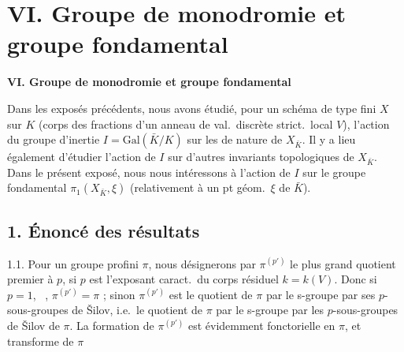\documentclass[11pt,a4paper]{article}
\begin{document}
\section{VI. Groupe de monodromie et groupe fondamental}

\textbf{VI. Groupe de monodromie et groupe fondamental}

 Dans les exposés précédents, nous avons étudié, pour un schéma de type fini $X$ sur $K$ (corps des fractions d'un anneau de val.\ discrète strict.\ local $V$), l'action du groupe d'inertie $I = \mathrm{Gal}(\bar K/K)$ sur les  de nature  de $X_{\bar K}$. Il y a lieu également d'étudier l'action de $I$ sur \struck{\ill{}} d'autres invariants topologiques \struck{\ill{}} de $X_{\bar K}$. Dans le présent exposé, nous nous intéressons à l'action de $I$ sur le groupe fondamental $\pi_1(X_{\bar K}, \xi)$ (relativement à un pt géom.\ $\xi$ de $\bar K$). 

\subsection{1. Énoncé des résultats}

1.1. Pour un groupe profini $\pi$, nous désignerons par $\pi^{(p')}$ le plus grand quotient  premier à $p$, si $p$ est l'exposant caract.\ du corps résiduel $k = k(V)$. Donc si $p = 1$, \ \ill{}, $\pi^{(p')} = \pi$ ; sinon $\pi^{(p')}$ est le quotient de $\pi$ par le s-groupe  par ses $p$-sous-groupes de Šilov, i.e.\ le quotient de $\pi$ par le s-groupe  par les $p$-sous-groupes de Šilov de $\pi$. La formation de $\pi^{(p')}$ est évidemment fonctorielle en $\pi$, et transforme  de $\pi$
\end{document}
